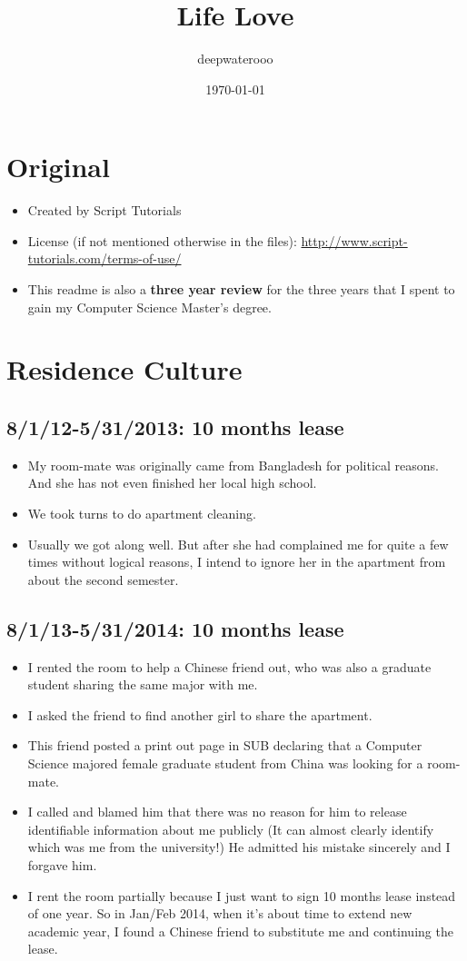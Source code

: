 \documentclass[9pt,b5paper]{article}
\author{deepwaterooo}
\date{\today}
\title{Life Love}
\begin{document}
\maketitle
\tableofcontents


\section{Original}
\label{sec-1}
\begin{itemize}
\item Created by Script Tutorials
\item License (if not mentioned otherwise in the files): \url{http://www.script-tutorials.com/terms-of-use/}
\item This readme is also a \textbf{three year review} for the three years that I spent to gain my Computer Science Master's degree.
\end{itemize}

\section{Residence Culture}
\label{sec-2}
\subsection{8/1/12-5/31/2013: 10 months lease}
\label{sec-2-1}
\begin{itemize}
\item My room-mate was originally came from Bangladesh for political reasons. And she has not even finished her local high school.
\item We took turns to do apartment cleaning.
\item Usually we got along well. But after she had complained me for quite a few times without logical reasons, I intend to ignore her in the apartment from about the second semester.
\end{itemize}

\subsection{8/1/13-5/31/2014: 10 months lease}
\label{sec-2-2}
\begin{itemize}
\item I rented the room to help a Chinese friend out, who was also a graduate student sharing the same major with me.
\item I asked the friend to find another girl to share the apartment.
\item This friend posted a print out page in SUB declaring that a Computer Science majored female graduate student from China was looking for a room-mate.
\item I called and blamed him that there was no reason for him to release identifiable information about me  publicly (It can almost clearly identify which was me from the university!) He admitted his mistake sincerely and I forgave him.
\item I rent the room partially because I just want to sign 10 months lease instead of one year. So in Jan/Feb 2014, when it's about time to extend new academic year, I found a Chinese friend to substitute me and continuing the lease.
\end{itemize}
\end{document}
